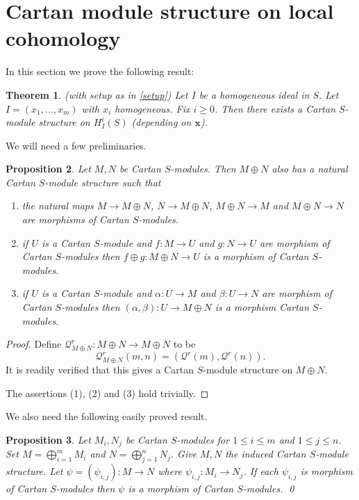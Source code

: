 \documentclass{amsart}
\newcommand{\xb}{\mathbf{x} }
\newcommand{\Qc}{\mathcal{Q} }
\newcommand{\rt}{\rightarrow}
\theoremstyle{plain}
\newtheorem{theorem}{Theorem}[section]
\newtheorem{proposition}[theorem]{Proposition}
\theoremstyle{definition}
\theoremstyle{remark}
\begin{document}
\section{Cartan module structure on local cohomology}
In this section we prove the following result:
\begin{theorem}\label{chief}
(with setup as in \ref{setup}) Let $I$ be a homogeneous ideal in $S$. Let $I = (x_1, \ldots, x_m)$ with $x_i$ homogeneous. Fix $i \geq 0$. Then there exists a Cartan $S$-module structure on $H^i_I(S)$ (depending on $\xb$).
\end{theorem}
We will need a few preliminaries.
\begin{proposition}\label{add}
Let $M, N$ be Cartan $S$-modules. Then $M \oplus N$  also has a natural Cartan $S$-module structure such that
\begin{enumerate}[\rm (1)]
  \item the natural maps $M \rt M\oplus N$, $N \rt M\oplus N$, $M\oplus N \rt M$ and $M\oplus N \rt N$ are morphisms of Cartan $S$-modules.
  \item if $U$ is a Cartan $S$-module and $f\colon M \rt U$ and $g \colon N\rt U$ are morphism of Cartan $S$-modules then $f\oplus g \colon M\oplus N \rt U$ is a morphism of Cartan $S$-modules.
  \item if $U$ is a Cartan $S$-module  and $\alpha \colon U \rt M$ and $\beta \colon U \rt N$ are morphism of Cartan $S$-modules then $(\alpha, \beta) \colon  U \rt M\oplus N$ is a morphism Cartan $S$-modules.
\end{enumerate}
\end{proposition}
\begin{proof}
Define $\Qc^r_{M\oplus N} \colon M\oplus N \rt M\oplus N$ to be
$$\Qc^r_{M\oplus N}(m, n) = (\Qc^r(m), \Qc^r(n)).$$
It is readily verified that this gives a Cartan $S$-module structure on $M\oplus N$.

The assertions (1), (2) and (3) hold trivially.
\end{proof}
We also need the following easily proved result.
\begin{proposition}\label{map-add}
Let $M_i, N_j$ be Cartan $S$-modules for $1 \leq i \leq m$ and $1\leq j \leq n$. Set $M = \bigoplus_{i = 1}^{m}M_i$ and $N = \bigoplus_{j = 1}^{n}N_j$. Give $M, N$ the induced Cartan $S$-module structure. Let $\psi = (\psi_{i,j})\colon M \rt N$ where $\psi_{i,j} \colon M_i \rt N_j$. If each $\psi_{i,j}$ is morphism of Cartan $S$-modules then $\psi$ is a morphism of Cartan $S$-modules. \qed
\end{proposition}
\end{document}
